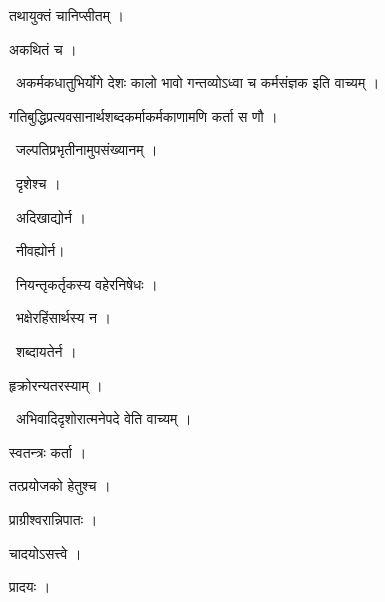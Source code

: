\documentclass[10pt, openany, oneside]{book}
\begin{document}
\noindent तथायुक्तं चानिप्सीतम् ।

\noindent अकथितं च ।

\par\noindent\hspace{1.5em}{\vps वा॰}~{\qt अकर्मकधातुभिर्योगे देशः कालो भावो गन्तव्योऽध्वा च कर्मसंज्ञक इति वाच्यम् ।}

\noindent गतिबुद्धिप्रत्यवसानार्थशब्दकर्माकर्मकाणामणि कर्ता स णौ ।

\par\noindent\hspace{1.5em}{\vps वा॰}~{\qt जल्पतिप्रभृतीनामुपसंख्यानम् ।}

\par\noindent\hspace{1.5em}{\vps वा॰}~{\qt दृशेश्च ।}

\par\noindent\hspace{1.5em}{\vps वा॰}~{\qt अदिखाद्योर्न ।}

\par\noindent\hspace{1.5em}{\vps वा॰}~{\qt नीवह्योर्न।}

\par\noindent\hspace{1.5em}{\vps वा॰}~{\qt नियन्तृकर्तृकस्य वहेरनिषेधः ।}

\par\noindent\hspace{1.5em}{\vps वा॰}~{\qt भक्षेरहिंसार्थस्य न ।}

\par\noindent\hspace{1.5em}{\vps वा॰}~{\qt शब्दायतेर्न ।}

\noindent हृक्रोरन्यतरस्याम् ।

\par\noindent\hspace{1.5em}{\vps वा॰}~{\qt अभिवादिदृशोरात्मनेपदे वेति वाच्यम् ।}

\noindent स्वतन्त्रः कर्ता ।

\noindent तत्प्रयोजको हेतुश्च ।

\noindent प्राग्रीश्वरान्निपातः ।

\noindent चादयोऽसत्त्वे ।

\noindent प्रादयः ।
\end{document}
